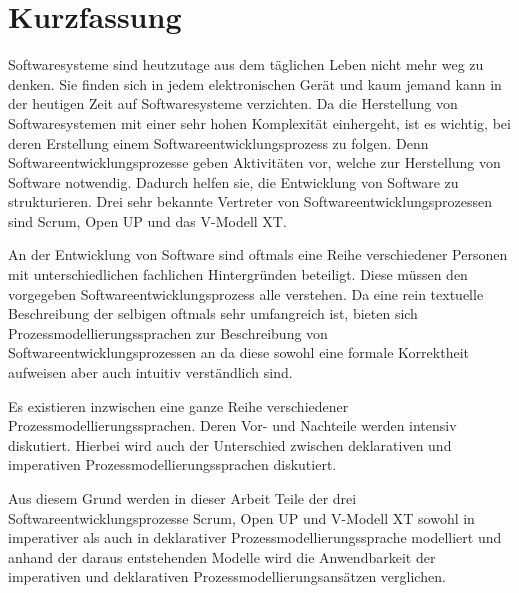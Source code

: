 \section*{Kurzfassung}

Softwaresysteme sind heutzutage aus dem täglichen Leben nicht mehr weg zu denken. Sie finden sich in jedem elektronischen Gerät und kaum jemand kann in der heutigen Zeit auf Softwaresysteme verzichten. Da die Herstellung von Softwaresystemen mit einer sehr hohen Komplexität einhergeht, ist es wichtig, 
bei deren Erstellung einem Softwareentwicklungsprozess zu folgen. Denn Softwareentwicklungsprozesse geben Aktivitäten vor, welche zur Herstellung von Software notwendig. Dadurch helfen sie, die Entwicklung von Software zu strukturieren. Drei sehr bekannte Vertreter von Softwareentwicklungsprozessen sind Scrum, Open UP und das V-Modell XT.\newline

An der Entwicklung von Software sind oftmals eine Reihe verschiedener Personen mit unterschiedlichen fachlichen Hintergründen beteiligt. Diese müssen den vorgegeben Softwareentwicklungsprozess alle verstehen. Da eine rein textuelle Beschreibung der selbigen oftmals sehr umfangreich ist, bieten sich Prozessmodellierungssprachen zur Beschreibung von Softwareentwicklungsprozessen an da diese sowohl eine formale Korrektheit aufweisen aber auch intuitiv verständlich sind.\newline

Es existieren inzwischen eine ganze Reihe verschiedener Prozessmodellierungssprachen. Deren Vor- und Nachteile werden intensiv diskutiert. Hierbei wird auch der Unterschied zwischen deklarativen und imperativen Prozessmodellierungssprachen diskutiert.\newline

Aus diesem Grund werden in dieser Arbeit Teile der drei Softwareentwicklungsprozesse Scrum, Open UP und V-Modell XT sowohl in imperativer als auch in deklarativer Prozessmodellierungssprache modelliert und anhand der daraus entstehenden Modelle wird die Anwendbarkeit der imperativen und deklarativen Prozessmodellierungsansätzen verglichen.



